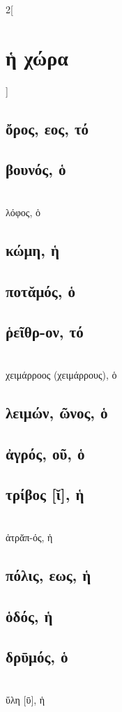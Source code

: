 \documentclass{book}
\begin{document}
\begin{multicols}{2}[\section{ἡ χώρα}]
\subsection{ὄρος, εος, τό}
\subsection{βουνός, ὁ}
 ~\\
λόφος, ὁ 
\subsection{κώμη, ἡ}
\subsection{ποτᾰμός, ὁ}
\subsection{ῥεῖθρ-ον, τό}
 ~\\
χειμάρροος (χειμάρρους), ὁ
\subsection{λειμών, ῶνος, ὁ}
\subsection{ἀγρός, οῦ, ὁ}
\subsection{τρίβος [ῐ], ἡ}
 ~\\
ἀτρᾰπ-ός, ἡ  
\subsection{πόλις, εως, ἡ}
\subsection{ὁδός, ἡ}
\subsection{δρῡμός, ὁ}
 ~\\
ὕλη [ῡ], ἡ 

\end{multicols}
\end{document}
